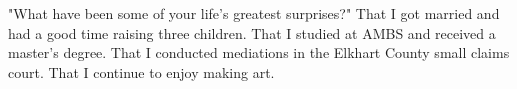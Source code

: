 "What have been some of your life's greatest surprises?"
That I got married and had a good time raising three children.
That I studied at AMBS and received a master's degree.
That I conducted mediations in the Elkhart County small claims court.
That I continue to enjoy making art.





